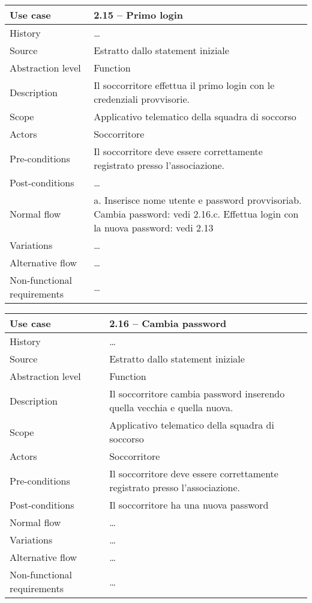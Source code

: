 \documentclass{article}
\begin{document}
    \begin{table}
        \begin{tabularx}{\textwidth}{l|X}
            Use case & 2.15 – Primo login\\
            \hline
            History & \dots \\
            Source & Estratto dallo statement iniziale\\
            Abstraction level & Function\\
            Description & Il soccorritore effettua il primo login con le credenziali provvisorie.\\
            Scope & Applicativo telematico della squadra di soccorso\\
            Actors & Soccorritore\\
            Pre-conditions & Il soccorritore deve essere correttamente registrato presso l’associazione. \\
            Post-conditions & \dots \\
            Normal flow & a. Inserisce nome utente e password provvisoria\newline b. Cambia password: vedi 2.16.\newline c. Effettua login con la nuova password: vedi 2.13 \\
            Variations & \dots \\
            Alternative flow & \dots \\
            Non-functional requirements & \dots
        \end{tabularx}
        \label{tab:usecase2.15}
    \end{table}

    \begin{table}
        \begin{tabularx}{\textwidth}{l|X}
            Use case & 2.16 – Cambia password\\
            \hline
            History & \dots \\
            Source & Estratto dallo statement iniziale\\
            Abstraction level & Function\\
            Description & Il soccorritore cambia password inserendo quella vecchia e quella nuova.\\
            Scope & Applicativo telematico della squadra di soccorso\\
            Actors & Soccorritore\\
            Pre-conditions & Il soccorritore deve essere correttamente registrato presso l’associazione. \\
            Post-conditions & Il soccorritore ha una nuova password \\
            Normal flow & \dots \\
            Variations & \dots \\
            Alternative flow & \dots \\
            Non-functional requirements & \dots
        \end{tabularx}
        \label{tab:usecase2.16}
    \end{table}
\end{document}
